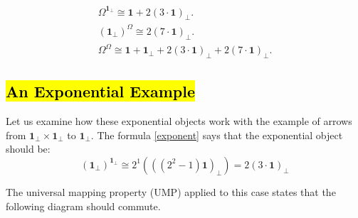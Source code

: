  \begin{ex}
 	\begin{gather*}
 		\Omega^{\textbf{1}_\bot} \cong \textbf{1} + 2(3 \cdot \textbf{1})_\bot. \\
 		(\textbf{1}_\bot) ^{\Omega} \cong 2(7 \cdot \textbf{1})_\bot. \\
 		 \Omega^{\Omega} \cong \textbf{1} + \textbf{1}_\bot + 2(3 \cdot \textbf{1})_\bot + 2(7 \cdot \textbf{1})_\bot.  
 	\end{gather*}
 \end{ex}
 
 
\newpage
\subsection{\hl{An Exponential Example}}

 Let us examine how these exponential objects work with the example of arrows from $\textbf{1}_\bot \times \textbf{1}_\bot$ to $\textbf{1}_\bot$. \newline
 The formula \ref{exponent} says that the exponential object should be:
 \[ (\textbf{1}_\bot) ^ {\textbf{1}_\bot} \cong 2^1 ( ( (2^2-1)\textbf{1} )_\bot ) = 2( 3\cdot\textbf{1})_\bot \]

The universal mapping property (UMP) applied to this case states that the following diagram should commute.

